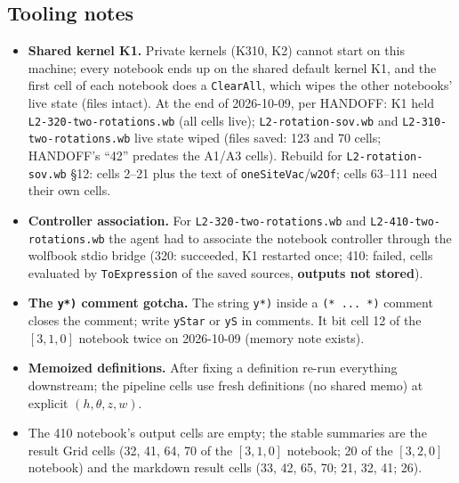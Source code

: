\documentclass[11pt]{article}
\newcommand{\nb}[1]{\texttt{#1}}
\begin{document}
\subsection{Tooling notes}\label{app:tool}
\begin{itemize}
\item \textbf{Shared kernel K1.} Private kernels (K310, K2) cannot start on this machine; every notebook ends up on the shared default kernel K1, and the first cell of each notebook does a \texttt{ClearAll}, which wipes the other notebooks' live state (files intact). At the end of 2026-10-09, per HANDOFF: K1 held \nb{L2-320-two-rotations.wb} (all cells live); \nb{L2-rotation-sov.wb} and \nb{L2-310-two-rotations.wb} live state wiped (files saved: 123 and 70 cells; HANDOFF's ``42'' predates the A1/A3 cells). Rebuild for \nb{L2-rotation-sov.wb} \S12: cells 2--21 plus the text of \nb{oneSiteVac}/\nb{w2Of}; cells 63--111 need their own cells.
\item \textbf{Controller association.} For \nb{L2-320-two-rotations.wb} and \nb{L2-410-two-rotations.wb} the agent had to associate the notebook controller through the wolfbook stdio bridge (320: succeeded, K1 restarted once; 410: failed, cells evaluated by \texttt{ToExpression} of the saved sources, \textbf{outputs not stored}).
\item \textbf{The \texttt{y*)} comment gotcha.} The string \texttt{y*)} inside a \texttt{(* ... *)} comment closes the comment; write \texttt{yStar} or \texttt{yS} in comments. It bit cell 12 of the $[3,1,0]$ notebook twice on 2026-10-09 (memory note exists).
\item \textbf{Memoized definitions.} After fixing a definition re-run everything downstream; the pipeline cells use fresh definitions (no shared memo) at explicit $(h,\theta,z,w)$.
\item The 410 notebook's output cells are empty; the stable summaries are the result Grid cells (32, 41, 64, 70 of the $[3,1,0]$ notebook; 20 of the $[3,2,0]$ notebook) and the markdown result cells (33, 42, 65, 70; 21, 32, 41; 26).
\end{itemize}
\end{document}
